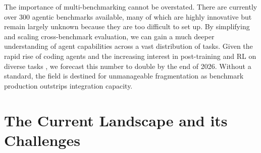 \documentclass{article}
\theoremstyle{plain}
\theoremstyle{definition}
\theoremstyle{remark}
\begin{document}
The importance of multi-benchmarking cannot be overstated. There are currently over 300 agentic benchmarks available, many of which are highly innovative but remain largely unknown because they are too difficult to set up. By simplifying and scaling cross-benchmark evaluation, we can gain a much deeper understanding of agent capabilities across a vast distribution of tasks. Given the rapid rise of coding agents \citep{yang2024swebenchverified, openhands2024, jimenez2023swebench, Deng2025SWEBenchPC} and the increasing interest in post-training and RL on diverse tasks \citep{Khatri2025TheAO, Park2025MAPoRLMP}, we forecast this number to double by the end of 2026. Without a standard, the field is destined for unmanageable fragmentation as benchmark production outstrips integration capacity.

\section{The Current Landscape and its Challenges}



\captionsetup[table]{position=top, font=small, labelfont=bf}
\end{document}
